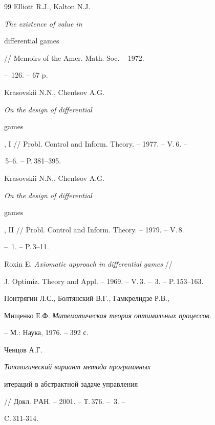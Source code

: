 \begin{thebibliography}{99}
 Elliott R.J., Kalton N.J. {\em The existence of value in


differential games} // Memoirs of the Amer. Math. Soc. -- 1972.


-- \No\,126. -- 67 p.





 Krasovskii N.N., Chentsov A.G. {\em On the design of differential


games}, I // Probl. Control and Inform. Theory. -- 1977. -- V.\,6. --


\No\,5--6. -- P.\,381--395.





 Krasovskii N.N., Chentsov A.G. {\em On the design of differential


games}, II // Probl. Control and Inform. Theory. -- 1979. -- V.\,8.


-- \No\,1. -- P.\,3--11.





 Roxin E. {\em Axiomatic approach in differential games} //


J. Optimiz. Theory and Appl. -- 1969. -- V.\,3. -- \No\,3. -- P.\,153--163.





 Понтрягин Л.С., Болтянский В.Г., Гамкрелидзе Р.В.,


Мищенко Е.Ф. {\em Математическая теория оптимальных процессов}.


-- М.: Наука, 1976. -- 392 с.





 Ченцов А.Г. {\em Топологический вариант метода программных


итераций в абстрактной задаче управления}


// Докл. PАН. -- 2001. -- Т.\,376. -- \No\,3. --


C.\,311-314.








\end{thebibliography}





\vskip 2cm














\label{end}





